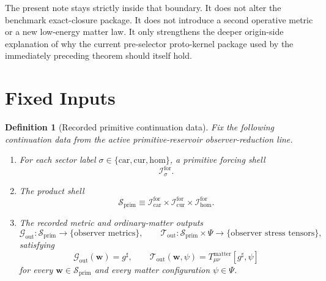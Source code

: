 \documentclass[11pt]{article}
\newcommand{\CompletedMetric}{g^{\sharp}}
\newcommand{\MatterSpace}{\Psi}
\newcommand{\Car}{\mathrm{car}}
\newcommand{\Cur}{\mathrm{cur}}
\newcommand{\Hom}{\mathrm{hom}}
\newcommand{\ForSpace}[1]{\mathcal I_{#1}^{\mathrm{for}}}
\newcommand{\PrimShell}{\mathcal S_{\mathrm{prim}}}
\newcommand{\MetricOut}{\mathscr G_{\mathrm{out}}}
\newcommand{\MatterOut}{\mathscr T_{\mathrm{out}}}
\newtheorem{definition}{Definition}
\begin{document}
The present note stays strictly inside that boundary. It does not alter the benchmark exact-closure package. It does not introduce a second operative metric or a new low-energy matter law. It only strengthens the deeper origin-side explanation of why the current pre-selector proto-kernel package used by the immediately preceding theorem should itself hold.

\section{Fixed Inputs}

\begin{definition}[Recorded primitive continuation data]
\label{def:fixed}
Fix the following continuation data from the active primitive-reservoir observer-reduction line.
\begin{enumerate}
    \item For each sector label \(\sigma\in\{\Car,\Cur,\Hom\}\), a primitive forcing shell
    \[
    \ForSpace{\sigma}.
    \]
    \item The product shell
    \[
    \PrimShell
    \equiv
    \ForSpace{\Car}\times \ForSpace{\Cur}\times \ForSpace{\Hom}.
    \]
    \item The recorded metric and ordinary-matter outputs
    \[
    \MetricOut:\PrimShell\to\{\text{observer metrics}\},
    \qquad
    \MatterOut:\PrimShell\times\MatterSpace\to\{\text{observer stress tensors}\},
    \]
    satisfying
    \begin{equation}
    \MetricOut(\mathbf w)=\CompletedMetric,
    \qquad
    \MatterOut(\mathbf w,\psi)
    =
    T_{\mu\nu}^{\mathrm{matter}}[\CompletedMetric,\psi]
    \label{eq:fixedoutputs}
    \end{equation}
    for every \(\mathbf w\in\PrimShell\) and every matter configuration \(\psi\in\MatterSpace\).
\end{enumerate}
\end{definition}
\end{document}
